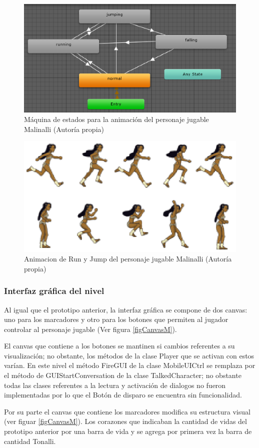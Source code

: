 \begin{figure}
  \centering
   \includegraphics[width=0.4 \textwidth]{05TrabajoRealizado/03Unity/imagenes/03MaquinaEstadosMalinalli}
  \caption{Máquina de estados para la animación del personaje jugable Malinalli (Autoría propia)}
  \label{figMaqMalinalli}
\end{figure}

\begin{figure}
  \centering
   \includegraphics[width=0.4 \textwidth]{05TrabajoRealizado/03Unity/imagenes/bloquesanimacionMalinalli}
  \caption{Animacion de Run y Jump del personaje jugable Malinalli (Autoría propia)}
  \label{figAniMalinalli}
\end{figure}

\subsubsection{Interfaz gráfica del nivel}
Al igual que el prototipo anterior, la interfaz gráfica se compone de dos canvas: uno 
para los marcadores y otro para los botones que permiten al jugador controlar al personaje jugable (Ver figura \ref{figCanvasM}).
\\
\par
El canvas que contiene a los botones se mantinen si cambios referentes a su 
visualización; no obstante, los métodos de la clase Player que se activan con 
estos varían. En este nivel el método FireGUI de la clase MobileUICtrl se 
remplaza por el método de GUIStartConversation de la clase TalkedCharacter; no 
obstante todas las clases referentes a la lectura y activación de dialogos no 
fueron implementadas por lo que el Botón de disparo se encuentra sin funcionalidad.
\\
\par
Por su parte el canvas que contiene los marcadores modifica su estructura visual (ver 
figuar \ref{figCanvasM}). Los corazones que indicaban la cantidad de vidas del 
prototipo anterior por una barra de vida y se agrega por primera vez la  
barra de cantidad Tonalli.   

